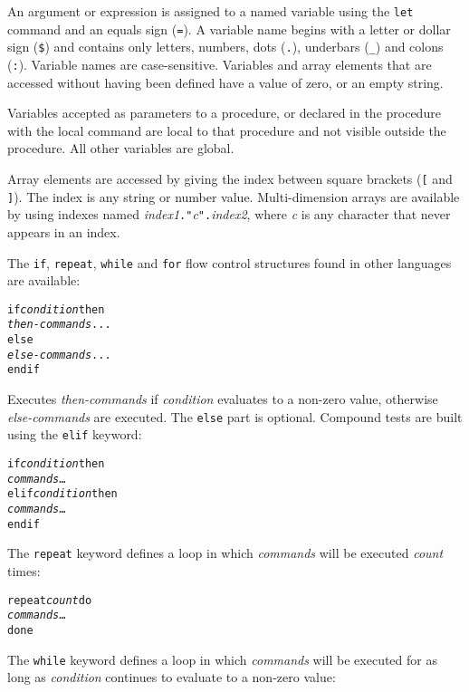 An argument or expression is assigned to a named variable using the
\texttt{let} command and an equals sign (\texttt{=}).  A variable name begins
with a letter or dollar sign (\texttt{\$}) and contains only letters, numbers,
dots (\texttt{.}), underbars (\texttt{\_}) and colons (\texttt{:}).
Variable names are
case-sensitive.  Variables and array elements that are accessed without having
been defined have a value of zero, or an empty string.

Variables accepted as parameters to a procedure, or declared in the procedure
with the local command are local to that procedure and not visible outside the
procedure.  All other variables are global.

Array elements are accessed by giving the index between
square brackets (\texttt{[} and \texttt{]}).
The index is any string or number value.
Multi-dimension arrays are available by using
indexes named \textit{index1}\texttt{."}\textit{c}\texttt{".}\textit{index2},
where \textit{c} is any character that never appears in an index.

The \texttt{if}, \texttt{repeat}, \texttt{while} and \texttt{for}
flow control structures
found in other languages are available:

\begin{alltt}
if \textit{condition} then
  \textit{then-commands} ...
else
  \textit{else-commands} ...
endif
\end{alltt}

Executes \textit{then-commands} if \textit{condition} evaluates to
a non-zero value, otherwise \textit{else-commands} are executed.
The \texttt{else} part is optional.
Compound tests are built using the \texttt{elif} keyword:

\begin{alltt}
if \textit{condition} then
  \textit{commands} \dots
elif \textit{condition} then
  \textit{commands} \dots
endif
\end{alltt}

The \texttt{repeat} keyword defines a loop in which
\textit{commands} will be executed \textit{count}
times:

\begin{alltt}
repeat \textit{count} do
  \textit{commands} \dots
done
\end{alltt}

The \texttt{while} keyword defines a loop in which
\textit{commands} will be executed for as long
as \textit{condition} continues to evaluate to a non-zero value:

